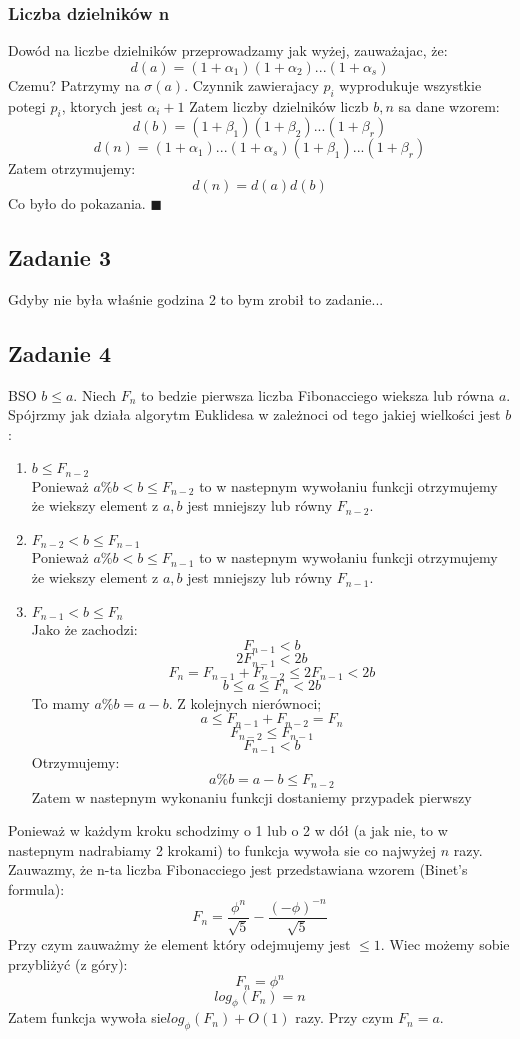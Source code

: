 \subsubsection{Liczba dzielników n}
Dowód na liczbe dzielników przeprowadzamy jak wyżej, zauważajac, że:
$$d(a) = (1+\alpha_1) ( 1+\alpha_2)... ( 1+\alpha_s)$$
Czemu? Patrzymy na $\sigma (a)$. Czynnik zawierajacy $p_i$ wyprodukuje wszystkie potegi $p_i$, ktorych jest $\alpha_i + 1$
Zatem liczby dzielników liczb $b, n$ sa dane wzorem:
$$d(b) = (1+\beta_1) ( 1+\beta_2)... ( 1+\beta_r)$$
$$d(n) = (1+\alpha_1)... ( 1+\alpha_s)(1+\beta_1)... ( 1+\beta_r)$$
Zatem otrzymujemy:
$$d(n) = d(a)d(b) $$
Co było do pokazania. $\blacksquare$

\subsection{Zadanie 3}
Gdyby nie była właśnie godzina 2 to bym zrobił to zadanie...

\subsection{Zadanie 4}
BSO $b\leq a$. Niech $F_n$ to bedzie pierwsza liczba Fibonacciego wieksza lub równa $a$. Spójrzmy jak działa algorytm Euklidesa w zależnoci od tego jakiej wielkości jest $b$:
\begin{enumerate}
	\item $b\leq F_{n-2}$\\
	      Ponieważ $a\%b < b \leq F_{n-2}$ to w nastepnym wywołaniu funkcji otrzymujemy że wiekszy element z $a,b$ jest mniejszy lub równy $F_{n-2}$.
	\item $F_{n-2}< b\leq F_{n-1}$\\
	      Ponieważ $a\%b < b \leq F_{n-1}$ to w nastepnym wywołaniu funkcji otrzymujemy że wiekszy element z $a,b$ jest mniejszy lub równy $F_{n-1}$.
	\item  $F_{n-1}< b \leq F_{n}$\\
	      Jako że zachodzi:
	      $$F_{n-1}< b$$
	      $$2F_{n-1}< 2b$$
	      $$F_n=F_{n-1}+F_{n-2}\leq 2F_{n-1}< 2b$$
	      $$b \leq a \leq F_n < 2b$$
	      To mamy $a\%b = a-b$. Z kolejnych nierównoci;
	      $$a\leq F_{n-1}+F_{n-2} =  F_n$$
	      $$F_{n-2} \leq  F_{n-1}$$
	      $$F_{n-1}< b$$
	      Otrzymujemy:
	      $$a\%b=a-b\leq F_{n-2}$$
	      Zatem w nastepnym wykonaniu funkcji dostaniemy przypadek pierwszy
\end{enumerate}
Ponieważ w każdym kroku schodzimy o 1 lub o 2 w dół (a jak nie, to w nastepnym nadrabiamy 2 krokami) to funkcja wywoła sie co najwyżej $n$ razy.
Zauwazmy, że n-ta liczba Fibonacciego jest przedstawiana wzorem (Binet's formula):
$$F_n = \frac{\phi^n}{\sqrt{5}} -\frac{(- \phi)^{-n}}{\sqrt{5}}$$
Przy czym zauważmy że element który odejmujemy jest $\leq1$. Wiec możemy sobie przybliżyć (z góry):
$$F_n = \phi^n$$
$$log_{\phi}(F_n) = n$$
Zatem funkcja wywoła sie$ log_{\phi}(F_n) + O(1)$ razy. Przy czym $F_n = a$.

